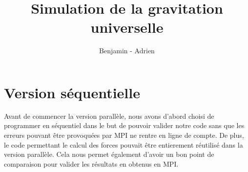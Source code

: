 \documentclass{article}
\title{Simulation de la gravitation universelle}
\author{Benjamin \bsc{Angelaud} - Adrien \bsc{Guilbaud}}
\begin{document}
\maketitle





\section{Version séquentielle}
Avant de commencer la version parallèle, nous avons d'abord choisi de programmer en séquentiel dans le but de pouvoir valider notre code sans que les erreurs pouvant être provoquées par MPI ne rentre en ligne de compte. De plus, le code permettant le calcul des forces pouvait être entierement réutilisé dans la version parallèle. Cela nous permet également d'avoir un bon point de comparaison pour valider les résultats en obtenus en MPI.
\end{document}
